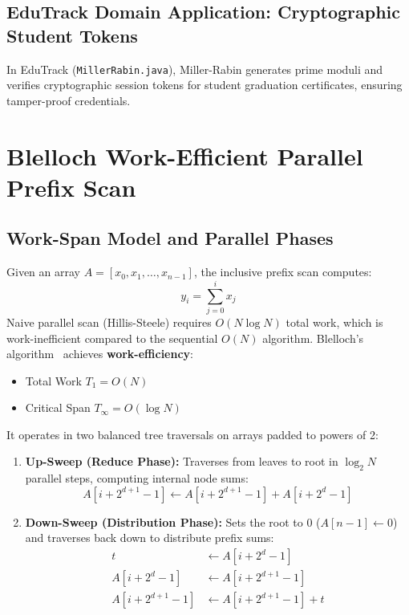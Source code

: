 \subsection{EduTrack Domain Application: Cryptographic Student Tokens}
In EduTrack (\texttt{MillerRabin.java}), Miller-Rabin generates prime moduli and verifies cryptographic session tokens for student graduation certificates, ensuring tamper-proof credentials.

\section{Blelloch Work-Efficient Parallel Prefix Scan}
\subsection{Work-Span Model and Parallel Phases}
Given an array $A = [x_0, x_1, \dots, x_{n-1}]$, the inclusive prefix scan computes:
\begin{equation}
y_i = \sum_{j=0}^i x_j
\end{equation}
Naive parallel scan (Hillis-Steele) requires $O(N \log N)$ total work, which is work-inefficient compared to the sequential $O(N)$ algorithm. Blelloch's algorithm~\cite{blelloch1990} achieves \textbf{work-efficiency}:
\begin{itemize}
    \item Total Work $T_1 = O(N)$
    \item Critical Span $T_\infty = O(\log N)$
\end{itemize}
It operates in two balanced tree traversals on arrays padded to powers of 2:
\begin{enumerate}
    \item \textbf{Up-Sweep (Reduce Phase):} Traverses from leaves to root in $\log_2 N$ parallel steps, computing internal node sums:
    \begin{equation}
    A[i + 2^{d+1} - 1] \gets A[i + 2^{d+1} - 1] + A[i + 2^d - 1]
    \end{equation}
    \item \textbf{Down-Sweep (Distribution Phase):} Sets the root to 0 ($A[n - 1] \gets 0$) and traverses back down to distribute prefix sums:
    \begin{align}
    t &\gets A[i + 2^d - 1] \nonumber \\
    A[i + 2^d - 1] &\gets A[i + 2^{d+1} - 1] \nonumber \\
    A[i + 2^{d+1} - 1] &\gets A[i + 2^{d+1} - 1] + t
    \end{align}
\end{enumerate}

